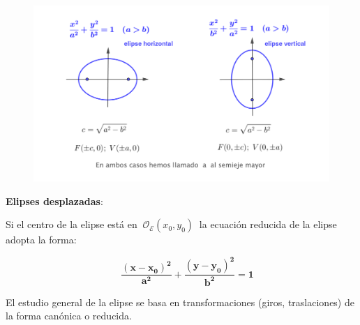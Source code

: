   	\begin{figure}[H]
	\centering
	\includegraphics[width=.85\textwidth]{img-conicas/conicas10.png}
	\end{figure}	

\textbf{Elipses desplazadas}:

Si el centro de la elipse está en $\ \mathcal O_{\mathcal E} (x_0,y_0)\ $ la ecuación reducida de la elipse adopta la forma: 

$$\ \quad \boldsymbol{ \boxed{ \ \dfrac{(x-x_0)^2}{a^2}+\dfrac{(y-y_0)^2}{b^2}= 1 \ } }$$

El estudio general de la elipse se basa en transformaciones (giros, traslaciones) de la forma canónica o reducida.

